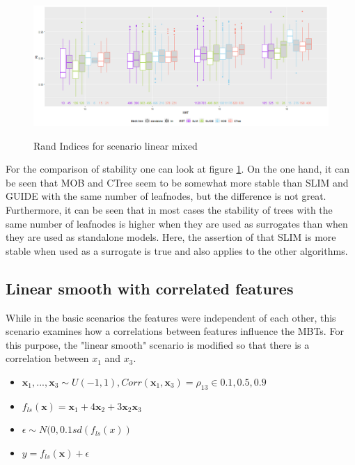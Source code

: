 \begin{figure}[!htb]
\caption{Rand Indices for scenario linear mixed}
    \includegraphics[width=16cm]{Figures/simulations/batchtools/basic_scenarios/linear_mixed/lm_1000_standalone_lm_sta.png}
    \label{fig:lm_1000_standalone_lm_sta}
\end{figure}

For the comparison of stability one can look at figure \ref{fig:lm_1000_standalone_lm_sta}. On the one hand, it can be seen that MOB and CTree seem to be somewhat more stable than SLIM and GUIDE with the same number of leafnodes, but the difference is not great. Furthermore, it can be seen that in most cases the stability of trees with the same number of leafnodes is higher when they are used as surrogates than when they are used as standalone models. Here, the assertion of \citep{Hu.2020} that SLIM is more stable when used as a surrogate is true and also applies to the other algorithms.


\newpage
\subsection{Linear smooth with correlated features}
While in the basic scenarios the features were independent of each other, this scenario examines how a correlations between features influence the MBTs. For this purpose, the "linear smooth" scenario is modified so that there is a correlation between $x_1$ and $x_3$.
\begin{itemize}
    \item $\textbf{x}_1,..., \textbf{x}_3 \sim U(-1,1), Corr(\textbf{x}_1, \textbf{x}_3) = \rho_{13} \in {0.1, 0.5, 0.9}$
    \item $ f_{ls}(\textbf{x}) = \textbf{x}_1 + 4   \textbf{x}_2 + 3   \textbf{x}_2   \textbf{x}_3 $
    \item $\epsilon \sim N(0, 0.1 sd(f_{ls}(x))$
    \item $y = f_{ls}(\textbf{x}) + \epsilon$
\end{itemize}

